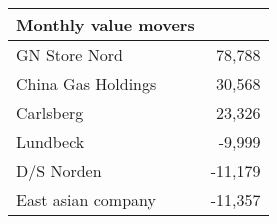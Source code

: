 \begin{tabular}{lr}

\toprule

Monthly value movers\\
\midrule

GN Store Nord & 78,788\\
China Gas Holdings & 30,568\\
Carlsberg & 23,326\\
\midrule

Lundbeck & -9,999\\
D/S Norden & -11,179\\
East asian company & -11,357\\
\bottomrule

\end{tabular}